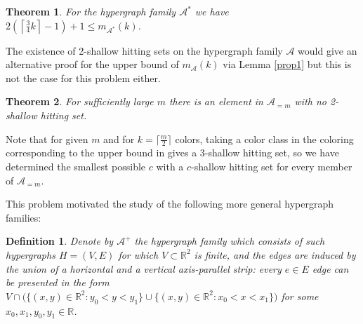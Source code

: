 \documentclass[11pt,oneside]{amsart}
\newcommand{\R}{\mathbb{R}}
\newcommand{\A}{\mathcal{A}}
\newtheorem{theorem}{Theorem}
\newtheorem{definition}{Definition}
\begin{document}
\begin{theorem}\label{strip_dual}
For the hypergraph family $\A^*$ we have 
$2\left(\left\lceil \frac{3}{4}k\right\rceil -1\right) + 1 \leq m_{\A^*}(k)$.
\end{theorem}

The existence of 2-shallow hitting sets on the hypergraph family $\A$ would give an alternative proof for the upper bound of $m_\A(k)$ via Lemma \ref{prop1} but this is not the case for this problem either.


\begin{theorem}\label{strip}
For sufficiently large $m$ there is an element in $\A_{=m}$ with no 2-shallow hitting set.
\end{theorem}

Note that for given $m$ and for $k= \lceil \frac{m}{2}\rceil$ colors, taking a color class in the coloring corresponding to the upper bound in \cite{apstrip} gives a 3-shallow hitting set, so we have determined the smallest possible $c$ with a $c$-shallow hitting set for every member of $\A_{=m}$. 


This problem motivated the study of the following more general hypergraph families:


\begin{definition} Denote by $\A^+$ the hypergraph family which consists of such hypergraphs $H=(V,E)$ for which $V\subset \R^2$ is finite, and the edges are induced by the union of a horizontal and a vertical axis-parallel strip: every $e\in E$ edge can be presented in the form $V\cap\big(\{(x,y)\in\R^2: y_0<y<y_1\}\cup \{(x,y)\in\R^2: x_0<x<x_1\}\big)$ for some $x_0,x_1,y_0,y_1\in\R$. 
\end{definition}
\end{document}
